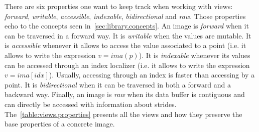 There are six properties one want to keep track when working with views: \emph{forward}, \emph{writable},
\emph{accessible}, \emph{indexable}, \emph{bidirectional} and \emph{raw}. Those properties echo to the concepts seen
in~\cref{sec:library.concepts}. An image is \emph{forward} when it can be traversed in a forward way. It is
\emph{writable} when the values are mutable. It is \emph{accessible} whenever it allows to access the value associated
to a point (i.e. it allows to write the expression \(v = ima(p)\)). It is \emph{indexable} whenever its values can be
accessed through an index localizer (i.e. it allows to write the expression \(v = ima[idx]\)). Usually, accessing
through an index is faster than accessing by a point. It is \emph{bidirectional} when it can be traversed in both a
forward and a backward way. Finally, an image is \emph{raw} when its data buffer is contiguous and can directly be
accessed with information about strides. The~\cref{table:views.properties} presents all the views and how they preserve
the base properties of a concrete image.

